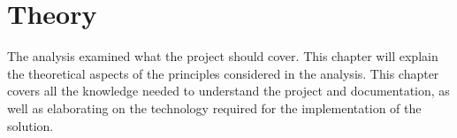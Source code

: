 \chapter{Theory}

The analysis examined what the project should cover.
This chapter will explain the theoretical aspects of the principles considered in the analysis.
This chapter covers all the knowledge needed to understand the project and documentation, as well as elaborating on the technology required for the implementation of the solution.



